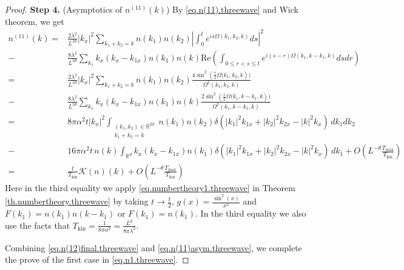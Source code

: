\begin{proof}
\textbf{Step 4.} (Asymptotics of $n^{(11)}(k)$) By \eqref{eq.n(11).threewave} and Wick theorem, we get 
\begin{equation}\label{eq.n(11)asym.threewave}
\begin{split}
    n^{(11)}(k)=&\frac{2\lambda^2}{L^{2d}} |k_x|^2\sum\limits_{k_1+k_2=k}n(k_1) n(k_2) \left|\int^{t}_0e^{i s\Omega(k_1,k_2,k)} ds\right|^2
    \\
    -&\frac{8\lambda^2}{L^{2d}}\sum_{k_1}k_x(k_x-k_{1x})n(k_1) n(k)\text{Re}\left(\int_{0\le r<s\le t} e^{i (s-r)\Omega(k_1,k-k_1,k)}  dsdr\right)
    \\
    =&\frac{2\lambda^2}{L^{2d}} |k_x|^2\sum\limits_{k_1+k_2=k}n(k_1) n(k_2) \frac{4\sin^2 \left(\frac{t}{2}\Omega(k_1,k_2,k\right))}{\Omega^2(k_1,k_2,k)}
    \\
    -&\frac{8\lambda^2}{L^{2d}}\sum_{k_1}k_x(k_x-k_{1x})n(k_1) n(k) \frac{2\sin^2 \left(\frac{t}{2}\Omega(k_1,k-k_1,k\right))}{\Omega^2(k_1,k-k_1,k)}
    \\
    =&8\pi \alpha^2t|k_x|^2\int_{\substack{(k_1, k_2)\in \mathbb{R}^{2d}\\k_1+k_2=k}}n(k_1) n(k_2)\delta(|k_1|^2k_{1x}+|k_2|^2k_{2x}-|k|^2k_{x})\, dk_1 dk_2
    \\
    -& 16\pi \alpha^2t\, n(k)\int_{\mathbb{R}^d}k_x(k_x-k_{1x})n(k_1) \delta(|k_1|^2k_{1x}+|k_2|^2k_{2x}-|k|^2k_{x})\, dk_1+O\left(L^{-\theta}\frac{T_{\text{max}}}{T_{\mathrm {kin}}}\right)
    \\
    =&\frac{t}{T_{\text{kin}}}\mathcal{K}(n)(k)+O\left(L^{-\theta}\frac{T_{\text{max}}}{T_{\mathrm {kin}}}\right)
\end{split}
\end{equation}
Here in the third equality we apply \eqref{eq.numbertheory1.threewave} in Theorem \ref{th.numbertheory.threewave} by taking $t\rightarrow\frac{t}{2}$, $g(x)=\frac{\sin^2(x)}{x^2}$ and $F(k_1)=n(k_1) n(k-k_1)$ or $F(k_1)=n(k_1)$. In the third equality we also use the facts that  $T_{\text{kin}}=\frac{1}{8\pi\alpha^2}=\frac{L^{d}}{8\pi\lambda^2}$.

Combining \eqref{eq.n(12)final.threewave} and \eqref{eq.n(11)asym.threewave}, we complete the prove of the first case in \eqref{eq.n1.threewave}.
\end{proof}
